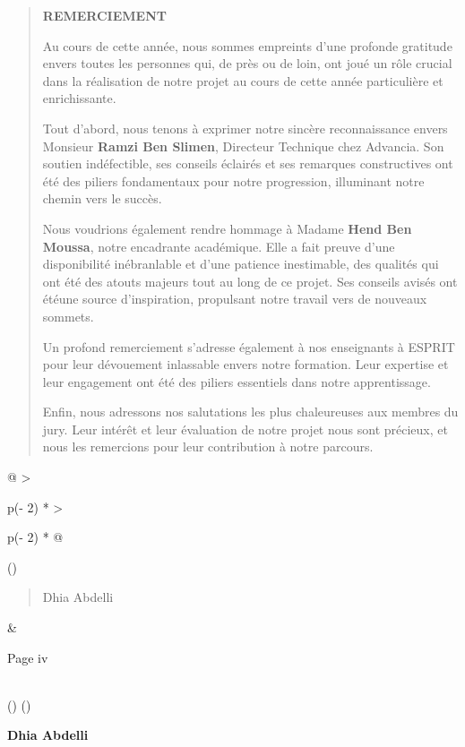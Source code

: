 \documentclass[
]{article}
\begin{document}
\begin{quote}
\textbf{REMERCIEMENT}

Au cours de cette année, nous sommes empreints d'une profonde gratitude
envers toutes les personnes qui, de près ou de loin, ont joué un rôle
crucial dans la réalisation de notre projet au cours de cette année
particulière et enrichissante.

Tout d'abord, nous tenons à exprimer notre sincère reconnaissance envers
Monsieur \textbf{Ramzi Ben Slimen}, Directeur Technique chez Advancia.
Son soutien indéfectible, ses conseils éclairés et ses remarques
constructives ont été des piliers fondamentaux pour notre progression,
illuminant notre chemin vers le succès.

Nous voudrions également rendre hommage à Madame \textbf{Hend Ben
Moussa}, notre encadrante académique. Elle a fait preuve d'une
disponibilité inébranlable et d'une patience inestimable, des qualités
qui ont été des atouts majeurs tout au long de ce projet. Ses conseils
avisés ont étéune source d'inspiration, propulsant notre travail vers de
nouveaux sommets.

Un profond remerciement s'adresse également à nos enseignants à ESPRIT
pour leur dévouement inlassable envers notre formation. Leur expertise
et leur engagement ont été des piliers essentiels dans notre
apprentissage.

Enfin, nous adressons nos salutations les plus chaleureuses aux membres
du jury. Leur intérêt et leur évaluation de notre projet nous sont
précieux, et nous les remercions pour leur contribution à notre
parcours.
\end{quote}

\begin{longtable}[]{@{}
  >{\raggedright\arraybackslash}p{(\columnwidth - 2\tabcolsep) * }
  >{\raggedright\arraybackslash}p{(\columnwidth - 2\tabcolsep) * }@{}}
\toprule()
\begin{minipage}[b]{\linewidth}\raggedright
\begin{quote}
Dhia Abdelli
\end{quote}
\end{minipage} & \begin{minipage}[b]{\linewidth}\raggedright
Page iv
\end{minipage} \\
\midrule()
\endhead
\bottomrule()
\end{longtable}

\textbf{Dhia Abdelli}
\end{document}
